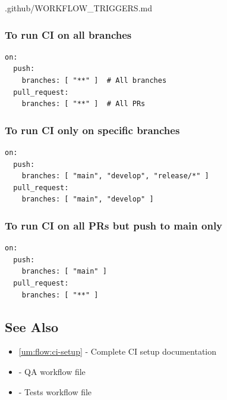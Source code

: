 \begin{relocated}{.github/WORKFLOW_TRIGGERS.md}
\subsubsection{To run CI on all branches}\label{um:flow:workflow-triggers:to-run-ci-on-all-branches}

\begin{lstlisting}[language={}]
on:
  push:
    branches: [ "**" ]  # All branches
  pull_request:
    branches: [ "**" ]  # All PRs
\end{lstlisting}

\subsubsection{To run CI only on specific branches}\label{um:flow:workflow-triggers:to-run-ci-only-on-specific-branches}

\begin{lstlisting}[language={}]
on:
  push:
    branches: [ "main", "develop", "release/*" ]
  pull_request:
    branches: [ "main", "develop" ]
\end{lstlisting}

\subsubsection{To run CI on all PRs but push to main only}\label{um:flow:workflow-triggers:to-run-ci-on-all-prs-but-push-to-main-only}

\begin{lstlisting}[language={}]
on:
  push:
    branches: [ "main" ]
  pull_request:
    branches: [ "**" ]
\end{lstlisting}

\subsection{See Also}\label{um:flow:workflow-triggers:see-also}

\begin{itemize}
\tightlist
\item
  \cref{um:flow:ci-setup} - Complete CI setup documentation
\item
   - QA workflow file
\item
   - Tests workflow file
\end{itemize}
\end{relocated}


